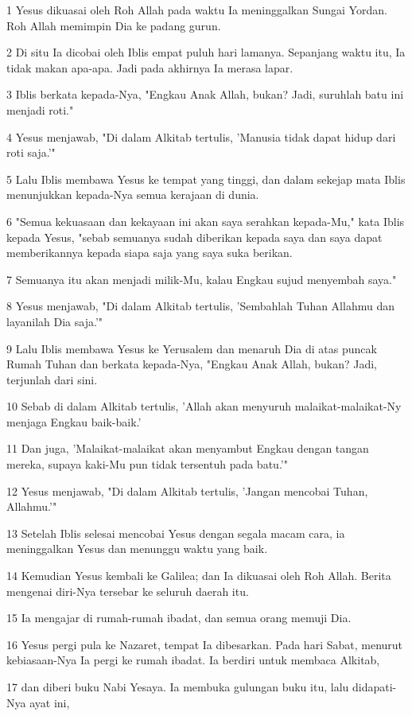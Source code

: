 \par 1 Yesus dikuasai oleh Roh Allah pada waktu Ia meninggalkan Sungai Yordan. Roh Allah memimpin Dia ke padang gurun.
\par 2 Di situ Ia dicobai oleh Iblis empat puluh hari lamanya. Sepanjang waktu itu, Ia tidak makan apa-apa. Jadi pada akhirnya Ia merasa lapar.
\par 3 Iblis berkata kepada-Nya, "Engkau Anak Allah, bukan? Jadi, suruhlah batu ini menjadi roti."
\par 4 Yesus menjawab, "Di dalam Alkitab tertulis, 'Manusia tidak dapat hidup dari roti saja.'"
\par 5 Lalu Iblis membawa Yesus ke tempat yang tinggi, dan dalam sekejap mata Iblis menunjukkan kepada-Nya semua kerajaan di dunia.
\par 6 "Semua kekuasaan dan kekayaan ini akan saya serahkan kepada-Mu," kata Iblis kepada Yesus, "sebab semuanya sudah diberikan kepada saya dan saya dapat memberikannya kepada siapa saja yang saya suka berikan.
\par 7 Semuanya itu akan menjadi milik-Mu, kalau Engkau sujud menyembah saya."
\par 8 Yesus menjawab, "Di dalam Alkitab tertulis, 'Sembahlah Tuhan Allahmu dan layanilah Dia saja.'"
\par 9 Lalu Iblis membawa Yesus ke Yerusalem dan menaruh Dia di atas puncak Rumah Tuhan dan berkata kepada-Nya, "Engkau Anak Allah, bukan? Jadi, terjunlah dari sini.
\par 10 Sebab di dalam Alkitab tertulis, 'Allah akan menyuruh malaikat-malaikat-Ny menjaga Engkau baik-baik.'
\par 11 Dan juga, 'Malaikat-malaikat akan menyambut Engkau dengan tangan mereka, supaya kaki-Mu pun tidak tersentuh pada batu.'"
\par 12 Yesus menjawab, "Di dalam Alkitab tertulis, 'Jangan mencobai Tuhan, Allahmu.'"
\par 13 Setelah Iblis selesai mencobai Yesus dengan segala macam cara, ia meninggalkan Yesus dan menunggu waktu yang baik.
\par 14 Kemudian Yesus kembali ke Galilea; dan Ia dikuasai oleh Roh Allah. Berita mengenai diri-Nya tersebar ke seluruh daerah itu.
\par 15 Ia mengajar di rumah-rumah ibadat, dan semua orang memuji Dia.
\par 16 Yesus pergi pula ke Nazaret, tempat Ia dibesarkan. Pada hari Sabat, menurut kebiasaan-Nya Ia pergi ke rumah ibadat. Ia berdiri untuk membaca Alkitab,
\par 17 dan diberi buku Nabi Yesaya. Ia membuka gulungan buku itu, lalu didapati-Nya ayat ini,
